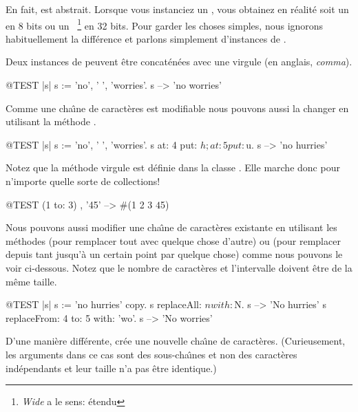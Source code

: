 \documentclass[a4paper,10pt,twoside]{book}
\begin{document}
En fait,  est abstrait.
Lorsque vous instanciez un , vous obtainez en r\'ealit\'e soit
un  en 8 bits ou un ~\footnote{\emph{Wide} a le sens: \'etendu} en 32 bits.
Pour garder les choses simples, nous ignorons habituellement la diff\'erence
et parlons simplement d'instances de  
 .

Deux instances de  peuvent \^etre concat\'en\'ees avec une virgule (en anglais, \emph{comma}).
\begin{code}{@TEST |s|}
s := 'no', ' ', 'worries'.
s -->  'no worries'
\end{code}

Comme une cha\^{\i}ne de caract\`eres est modifiable nous pouvons aussi la
changer en utilisant la m\'ethode .

\begin{code}{@TEST |s| s := 'no', ' ', 'worries'.}
s at: 4 put: $h; at: 5 put: $u.
s --> 'no hurries'
\end{code}

Notez que la m\'ethode virgule est d\'efinie dans la classe .
Elle marche donc pour n'importe quelle sorte de collections!
\begin{code}{@TEST}
(1 to: 3) , '45' --> #(1 2 3 $4 $5)
\end{code}

Nous pouvons aussi modifier une cha\^{\i}ne de caract\`eres existante
en utilisant les m\'ethodes  
(pour remplacer tout avec quelque chose d'autre)
ou 
(pour remplacer depuis tant jusqu'\`a un certain point par quelque chose)
comme nous pouvons le voir ci-dessous. Notez que le nombre de caract\`eres
et l'intervalle doivent \^etre de la m\^eme taille.

\begin{code}{@TEST |s| s := 'no hurries' copy.}
s replaceAll: $n with: $N.
s --> 'No hurries'
s replaceFrom: 4 to: 5 with: 'wo'.
s --> 'No worries'
\end{code}

D'une mani\`ere diff\'erente,  cr\'ee 
une nouvelle cha\^{\i}ne de caract\`eres.
(Curieusement, les arguments dans ce cas sont des sous-cha\^{\i}nes et non des caract\`eres ind\'ependants et leur taille n'a pas \^etre identique.)
\end{document}
